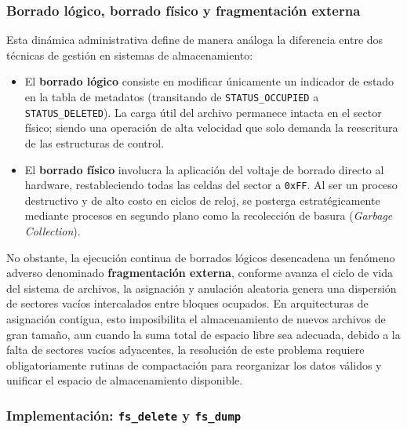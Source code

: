 \documentclass[12pt,letterpaper]{article}
\begin{document}
\subsubsection*{Borrado lógico, borrado físico y fragmentación externa}
Esta dinámica administrativa define de manera análoga la diferencia entre dos técnicas de gestión en sistemas de
almacenamiento:

\begin{itemize}
\item El \textbf{borrado lógico} consiste en modificar únicamente un indicador de estado en la tabla de metadatos
  (transitando de \texttt{STATUS\_OCCUPIED} a \texttt{STATUS\_DELETED}). La carga útil del archivo permanece
  intacta en el sector físico; siendo una operación de alta velocidad que solo demanda la reescritura de las
  estructuras de control.
\item El \textbf{borrado físico} involucra la aplicación del voltaje de borrado directo al hardware,
  restableciendo todas las celdas del sector a \texttt{0xFF}. Al ser un proceso destructivo y de alto costo en
  ciclos de reloj, se posterga estratégicamente mediante procesos en segundo plano como la recolección de basura
  (\textit{Garbage Collection}).
\end{itemize}

No obstante, la ejecución continua de borrados lógicos desencadena un fenómeno adverso denominado
\textbf{fragmentación externa}, conforme avanza el ciclo de vida del sistema de archivos, la asignación y
anulación aleatoria genera una dispersión de sectores vacíos intercalados entre bloques ocupados.
En arquitecturas de asignación contigua, esto imposibilita el almacenamiento de nuevos archivos de gran tamaño,
aun cuando la suma total de espacio libre sea adecuada, debido a la falta de sectores vacíos adyacentes, la
resolución de este problema requiere obligatoriamente rutinas de compactación para reorganizar los datos
válidos y unificar el espacio de almacenamiento disponible.

\subsubsection*{Implementación: \texttt{fs\_delete} y \texttt{fs\_dump}}
\end{document}
